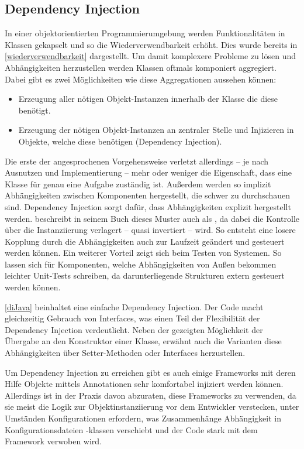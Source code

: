 \subsection{Dependency Injection}
In einer objektorientierten Programmierumgebung werden Funktionalitäten in Klassen gekapselt und so die Wiederverwendbarkeit erhöht. Dies wurde bereits in \autoref{wiederverwendbarkeit} dargestellt. Um damit komplexere Probleme zu lösen und Abhängigkeiten herzustellen werden Klassen oftmals komponiert \bzw aggregiert. Dabei gibt es zwei Möglichkeiten wie diese Aggregationen aussehen können:

\begin{itemize}
    \item Erzeugung aller nötigen Objekt-Instanzen innerhalb der Klasse die diese benötigt.
    \item Erzeugung der nötigen Objekt-Instanzen an zentraler Stelle und Injizieren in Objekte, welche diese benötigen (Dependency Injection). 
\end{itemize}

Die erste der angesprochenen Vorgehensweise verletzt allerdings -- je nach Ausnutzen und Implementierung -- mehr oder weniger die Eigenschaft, dass eine Klasse für genau eine Aufgabe zuständig ist. Außerdem werden so implizit Abhängigkeiten zwischen Komponenten hergestellt, die schwer zu durchschauen sind. Dependency Injection sorgt dafür, dass Abhängigkeiten explizit hergestellt werden. \citeauthor{martin_clean_2008} beschreibt in seinem Buch  dieses Muster auch als , da dabei die Kontrolle über die Instanziierung verlagert -- quasi invertiert -- wird. So entsteht eine losere Kopplung durch die Abhängigkeiten auch zur Laufzeit geändert und gesteuert werden können. Ein weiterer Vorteil zeigt sich beim Testen von Systemen. So lassen sich für Komponenten, welche Abhängigkeiten von Außen bekommen leichter Unit-Tests schreiben, da darunterliegende Strukturen extern gesteuert werden können.


\autoref{diJava} beinhaltet eine einfache Dependency Injection. Der Code macht gleichzeitig Gebrauch von Interfaces, was einen Teil der Flexibilität der Dependency Injection verdeutlicht. Neben der gezeigten Möglichkeit der Übergabe an den Konstruktor einer Klasse, erwähnt \citeauthor{martin_clean_2008} \cite{martin_clean_2008} auch die Varianten diese Abhängigkeiten über Setter-Methoden oder Interfaces herzustellen.

Um Dependency Injection zu erreichen gibt es auch einige Frameworks mit deren Hilfe Objekte \zB mittels Annotationen sehr komfortabel injiziert werden können. Allerdings ist in der Praxis davon abzuraten, diese Frameworks zu verwenden, da sie meist die Logik zur Objektinstanziierung vor dem Entwickler verstecken, unter Umständen Konfigurationen erfordern, was Zusammenhänge Abhängigkeit in Konfigurationsdateien \bzw -klassen verschiebt und der Code stark mit dem Framework verwoben wird. 